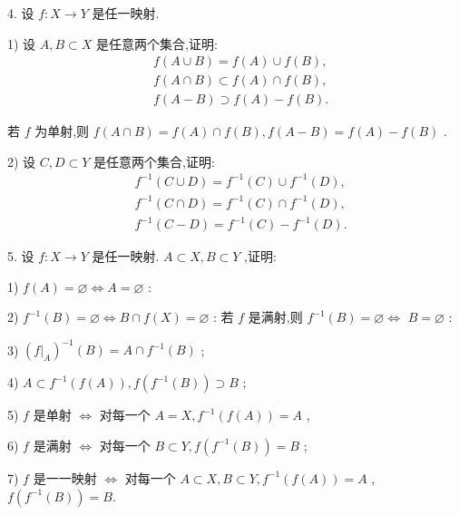 4. 设 $f : X \rightarrow  Y$ 是任一映射.

1) 设 $A,B \subset  X$ 是任意两个集合,证明:
\begin{align*}
	&f\left( {A \cup  B}\right)  = f\left( A\right)  \cup  f\left( B\right) ,\\
	&f\left( {A \cap  B}\right)  \subset  f\left( A\right)  \cap  f\left( B\right) ,\\
	&f\left( {A - B}\right)  \supset  f\left( A\right)  - f\left( B\right) .
\end{align*}

若 $f$ 为单射,则 $f\left( {A \cap  B}\right)  = f\left( A\right)  \cap  f\left( B\right) ,f\left( {A - B}\right)  = f\left( A\right)  - f\left( B\right)$ .

2) 设 $C,D \subset  Y$ 是任意两个集合,证明:
\begin{align*}
	&{f}^{-1}\left( {C \cup  D}\right)  = {f}^{-1}\left( C\right)  \cup  {f}^{-1}\left( D\right) ,\\
	&{f}^{-1}\left( {C \cap  D}\right)  = {f}^{-1}\left( C\right)  \cap  {f}^{-1}\left( D\right) ,\\
	&{f}^{-1}\left( {C - D}\right)  = {f}^{-1}\left( C\right)  - {f}^{-1}\left( D\right) .
\end{align*}

5. 设 $f : X \rightarrow  Y$ 是任一映射. $A \subset  X,B \subset  Y$ ,证明:

1) $f\left( A\right)  = \varnothing  \Leftrightarrow  A = \varnothing$ :

2) ${f}^{-1}\left( B\right)  = \varnothing  \Leftrightarrow  B \cap  f\left( X\right)  = \varnothing$ : 若 $f$ 是满射,则 ${f}^{-1}\left( B\right)  = \varnothing  \Leftrightarrow$  $B = \varnothing$ :

3) ${\left( {\left. f\right| }_{A}\right) }^{-1}\left( B\right)  = A \cap  {f}^{-1}\left( B\right)$ ;

4) $A \subset  {f}^{-1}\left( {f\left( A\right) }\right) ,f\left( {{f}^{-1}\left( B\right) }\right)  \supset  B$ ;

5) $f$ 是单射 $\Leftrightarrow$ 对每一个 $A = X,{f}^{-1}\left( {f\left( A\right) }\right)  = A$ ,

6) $f$ 是满射 $\Leftrightarrow$ 对每一个 $B \subset  Y,f\left( {{f}^{-1}\left( B\right) }\right)  = B$ ;

7) $f$ 是一一映射 $\Leftrightarrow$ 对每一个 $A \subset  X,B \subset  Y,{f}^{-1}\left( {f\left( A\right) }\right)  = A$ , $f\left( {{f}^{-1}\left( B\right) }\right)  = B.$


